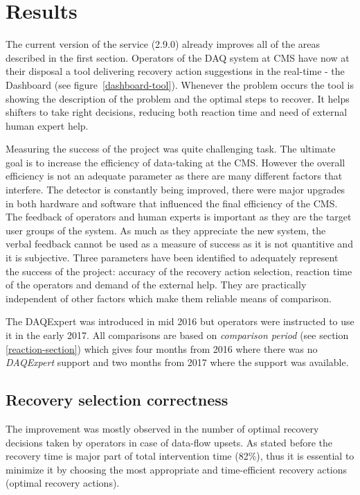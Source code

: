 \documentclass[a4paper]{jpconf}
\begin{document}
\section{Results}

The current version of the service (2.9.0) already improves all of the areas described in the first section. Operators of the DAQ system at CMS have now at their disposal a tool delivering recovery action suggestions in the real-time - the Dashboard (see figure~\ref{dashboard-tool}). Whenever the problem occurs the tool is showing the description of the problem and the optimal steps to recover. It helps shifters to take right decisions, reducing both reaction time and need of external human expert help.

Measuring the success of the project was quite challenging task. The ultimate goal is to increase the efficiency of data-taking at the CMS. However the overall efficiency is not an adequate parameter as there are many different factors that interfere. The detector is constantly being improved, there were major upgrades in both hardware and software that influenced the final efficiency of the CMS. The feedback of operators and human experts is important as they are the target user groups of the system. As much as they appreciate the new system, the verbal feedback cannot be used as a measure of success as it is not quantitive and it is subjective. Three parameters have been identified to adequately represent the success of the project: accuracy of the recovery action selection, reaction time of the operators and demand of the external help. They are practically independent of other factors which make them reliable means of comparison.

The DAQExpert was introduced in mid 2016 but operators were instructed to use it in the early 2017. All comparisons are based on {\it comparison period} (see section \ref{reaction-section}) which gives four months from 2016 where there was no{ \it DAQExpert} support and two months from 2017 where the support was available. 


\subsection{Recovery selection correctness}

The improvement was mostly observed in the number of optimal recovery decisions taken by operators in case of data-flow upsets. As stated before the recovery time is major part of total intervention time (82\%), thus it is essential to minimize it by choosing the most appropriate and time-efficient recovery actions (optimal recovery actions). 
\end{document}
